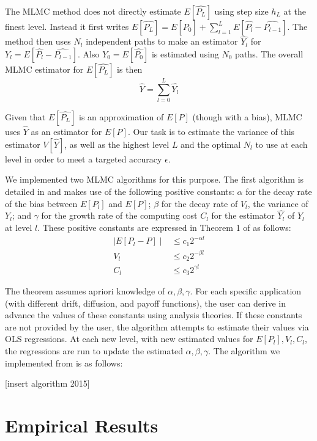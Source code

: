 \documentclass{article}
\begin{document}
	The MLMC method does not directly estimate $E[\widehat{P_L}]$ using step size $h_L$ at the finest level. Instead it first writes $E[\widehat{P_L}] = E[\widehat{P_0}] + \sum_{l=1}^L E[\widehat{P_l} - \widehat{P_{l-1}}]$. The method then uses $N_l$ independent paths to make an estimator $\widehat{Y_l}$ for $Y_l = E[\widehat{P_l} - \widehat{P_{l-1}}]$. Also $Y_0 = E[\widehat{P_0}]$ is estimated using $N_0$ paths. The overall MLMC estimator for $E[\widehat{P_L}]$ is then
	$$\widehat{Y} = \sum_{l=0}^L \widehat{Y_l}$$
	
	Given that $E[\widehat{P_L}]$ is an approximation of $E[P]$ (though with a bias), MLMC uses $\widehat{Y}$ as an estimator for $E[P]$. Our task is to estimate the variance of this estimator $V[\widehat{Y}]$, as well as the highest level $L$ and the optimal $N_l$ to use at each level in order to meet a targeted accuracy $\epsilon$.
	
	We implemented two MLMC algorithms for this purpose. The first algorithm is detailed in \cite{giles15} and makes use of the following positive constants: $\alpha$ for the decay rate of the bias between $E[P_l]$ and $E[P]$; $\beta$ for the decay rate of $V_l$, the variance of $Y_l$; and $\gamma$ for the growth rate of the computing cost $C_l$ for the estimator $\widehat{Y_l}$ of $Y_l$ at level $l$. These positive constants are expressed in Theorem 1 of \cite{giles15} as follows:
	\begin{align*}
	\mid E[P_l -P] \mid &\leq c_1 2^{-\alpha l} \\
	V_l &\leq c_2 2^{-\beta l} \\
	C_l &\leq c_3 2^{\gamma l}
	\end{align*}
	
	The theorem assumes apriori knowledge of $\alpha, \beta, \gamma$. For each specific application (with different drift, diffusion, and payoff functions), the user can derive in advance the values of these constants using analysis theories. If these constants are not provided by the user, the algorithm attempts to estimate their values via OLS regressions. At each new level, with new estimated values for $E[P_l], V_l, C_l$, the regressions are run to update the estimated $\alpha, \beta, \gamma$. The algorithm we implemented from \cite{giles15} is as follows:
	
	[insert algorithm 2015]
		
	
	
\section{Empirical Results}



\end{document}
